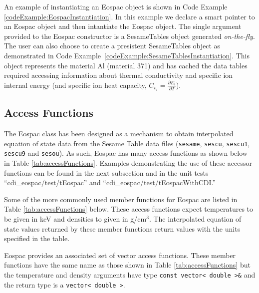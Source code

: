 \documentclass[11pt]{nmemo}
\begin{document}
An example of instantiating an Eospac object is shown in Code Example
\ref{codeExample:EospacInstantiation}.  In this example we declare a
smart pointer to an Eospac object and then intantiate the Eospac
object.  The single argument provided to the Eospac constructor is a
SesameTables object generated \emph{on-the-fly}.  The user can also
choose to create a presistent SesameTables object as demonstrated in
Code Example~\ref{codeExample:SesameTablesInstantiation}.  This object 
represents the material Al (material 371) and has cached the data
tables required accessing information about thermal conductivity and
specific ion internal energy (and specific ion heat capacity, $C_{v_i} =
\frac{\partial E_i} {\partial T}$).



\subsection{Access Functions}

The Eospac class has been designed as a mechanism to obtain
interpolated equation of state data from the Sesame Table data files
(\texttt{sesame}, \texttt{sescu}, \texttt{sescu1}, \texttt{sescu9} and
\texttt{sesou}).  As such, Eospac has many access functions as shown
below in Table \ref{tab:accessFunctions}.  Examples demonstrating the
use of these accessor functions can be found in the next subsection
and in the unit tests ``cdi\_eospac/test/tEospac'' and
``cdi\_eospac/test/tEospacWithCDI.''


Some of the more commonly used member functions for Eospac are listed
in Table \ref{tab:accessFunctions} below.  These access functions
expect temperatures to be given in keV and densities to given in
g/cm$^3$.  The interpolated equation of state values returned by these
member functions return values with the units specified in the table.

Eospac provides an associated set of vector access functions.  These
member functions have the same name as those shown in
Table \ref{tab:accessFunctions} but the temperature and density
arguments have type \texttt{const~vector< double >\&} and the return
type is a \texttt{vector< double >}.
\end{document}
